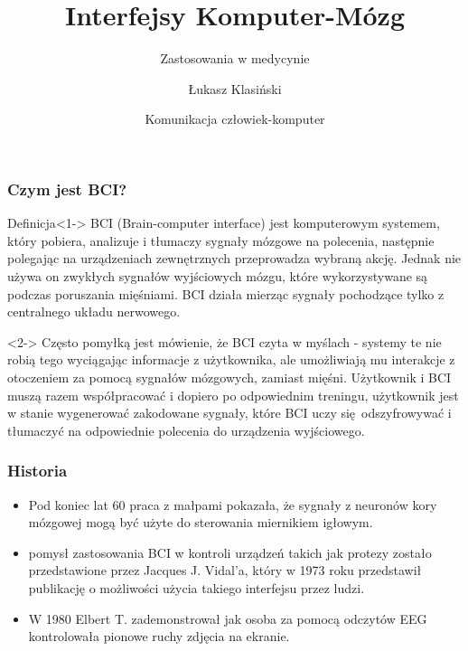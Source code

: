 \documentclass{beamer}
\title[	Interfejsy Komputer-Mózg]
{Interfejsy Komputer-Mózg}
\subtitle{Zastosowania w medycynie }
\author[Łukasz Klasiński] 
{ Łukasz Klasiński}
\institute[UWr]
{
  Wydział informatyki\\
  Uniwersytet Wrocławski
}
\date[18-12-2018]
{ Komunikacja człowiek-komputer }
\begin{document}
 
\frame{\titlepage}

\begin{frame}
\frametitle{Czym jest BCI?}

    \begin{block}{Definicja}<1->
        BCI (Brain-computer interface) jest komputerowym systemem, który pobiera, analizuje i tłumaczy sygnały mózgowe na polecenia, następnie polegając
        na urządzeniach zewnętrznych przeprowadza wybraną akcję. Jednak nie używa on zwykłych sygnałów wyjściowych mózgu, które
        wykorzystywane są podczas poruszania mięśniami. BCI działa mierząc sygnały pochodzące tylko z centralnego układu
        nerwowego. 
    \end{block}    
    \begin{exampleblock}{}<2->
        Często pomyłką jest mówienie, że BCI czyta w myślach - systemy te nie robią tego wyciągając informacje
        z użytkownika, ale umożliwiają mu interakcje z otoczeniem za pomocą sygnałów mózgowych, zamiast mięśni. Użytkownik 
        i BCI muszą razem współpracować i dopiero po odpowiednim treningu, użytkownik jest w stanie wygenerować zakodowane sygnały, 
        które BCI uczy się odszyfrowywać i tłumaczyć na odpowiednie polecenia do urządzenia wyjściowego.        
    \end{exampleblock}
\end{frame}

\begin{frame}
    \frametitle{Historia}

    \begin{itemize}
        \item <1->Pod koniec lat 60 praca z małpami pokazała, że sygnały z  neuronów kory mózgowej mogą być użyte do sterowania miernikiem igłowym.  
        \item <2-> pomysł zastosowania BCI w kontroli urządzeń takich jak protezy zostało przedstawione przez Jacques J. Vidal'a, który w 1973 roku przedstawił publikację o możliwości użycia takiego interfejsu przez ludzi.   
        \item <3-> W 1980 Elbert T. zademonstrował jak osoba za pomocą odczytów EEG kontrolowała pionowe ruchy zdjęcia na ekranie.
    \end{itemize}
\end{frame}
\end{document}
